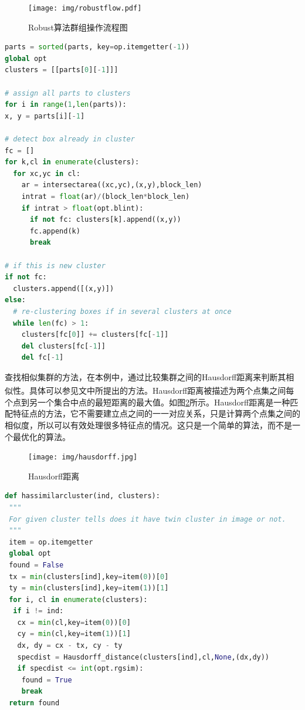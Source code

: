 \documentclass[a4paper, 10pt, notitlepage]{report}
\newcommand{\supercite}[1]{\textsuperscript{\cite{#1}}}
\begin{document}
\begin{figure}[htp]
	\centering
	\texttt{[image: img/robustflow.pdf]}
	\label{fig-robustflow}
	\caption{Robust算法群组操作流程图}
\end{figure}

\begin{lstlisting}[language=Python]
parts = sorted(parts, key=op.itemgetter(-1))
global opt
clusters = [[parts[0][-1]]]

# assign all parts to clusters
for i in range(1,len(parts)):
x, y = parts[i][-1]

# detect box already in cluster
fc = []
for k,cl in enumerate(clusters):
  for xc,yc in cl:
    ar = intersectarea((xc,yc),(x,y),block_len)
    intrat = float(ar)/(block_len*block_len)
    if intrat > float(opt.blint):
      if not fc: clusters[k].append((x,y))
      fc.append(k)
      break

# if this is new cluster
if not fc:
  clusters.append([(x,y)])
else:
  # re-clustering boxes if in several clusters at once
  while len(fc) > 1:
    clusters[fc[0]] += clusters[fc[-1]]
    del clusters[fc[-1]]
    del fc[-1]
\end{lstlisting}

查找相似集群的方法，在本例中，通过比较集群之间的Hausdorff距离来判断其相似性。具体可以参见文\supercite{huttenlocher1993comparing}中所提出的方法。Hausdorff距离被描述为两个点集之间每个点到另一个集合中点的最短距离的最大值。如图\ref{hausdorff}所示。Hausdorff距离是一种匹配特征点的方法，它不需要建立点之间的一一对应关系，只是计算两个点集之间的相似度，所以可以有效处理很多特征点的情况。这只是一个简单的算法，而不是一个最优化的算法。

\begin{figure}[htp]
    \centering
    \texttt{[image: img/hausdorff.jpg]}
    \label{hausdorff}
    \caption{Hausdorff距离}
\end{figure}

\begin{lstlisting}[language=Python]
def hassimilarcluster(ind, clusters):
 """
 For given cluster tells does it have twin cluster in image or not.
 """
 item = op.itemgetter
 global opt
 found = False
 tx = min(clusters[ind],key=item(0))[0]
 ty = min(clusters[ind],key=item(1))[1]
 for i, cl in enumerate(clusters):
  if i != ind:
   cx = min(cl,key=item(0))[0]
   cy = min(cl,key=item(1))[1]
   dx, dy = cx - tx, cy - ty
   specdist = Hausdorff_distance(clusters[ind],cl,None,(dx,dy))
   if specdist <= int(opt.rgsim):
    found = True
    break
 return found
\end{lstlisting}
\end{document}
